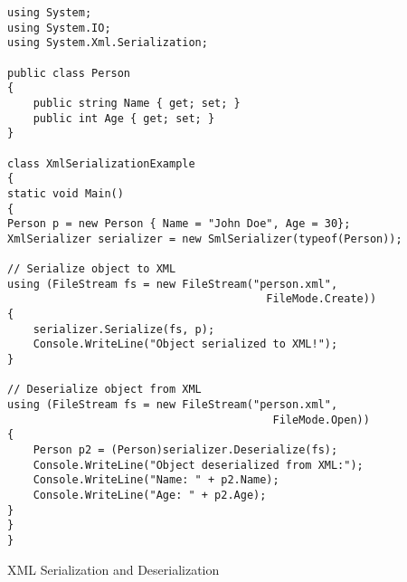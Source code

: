 \begin{listing}[H]
\begin{verbatim}
using System;
using System.IO;
using System.Xml.Serialization;

public class Person
{
    public string Name { get; set; }
    public int Age { get; set; }
}

class XmlSerializationExample
{
static void Main()
{
Person p = new Person { Name = "John Doe", Age = 30};
XmlSerializer serializer = new SmlSerializer(typeof(Person));

// Serialize object to XML
using (FileStream fs = new FileStream("person.xml", 
                                        FileMode.Create))
{
    serializer.Serialize(fs, p);
    Console.WriteLine("Object serialized to XML!");
}

// Deserialize object from XML
using (FileStream fs = new FileStream("person.xml",
                                         FileMode.Open))
{
    Person p2 = (Person)serializer.Deserialize(fs);
    Console.WriteLine("Object deserialized from XML:");
    Console.WriteLine("Name: " + p2.Name);
    Console.WriteLine("Age: " + p2.Age);
}
}
}
\end{verbatim}
\caption{XML Serialization and Deserialization} 
\label{XMLSerialization}
\end{listing}
